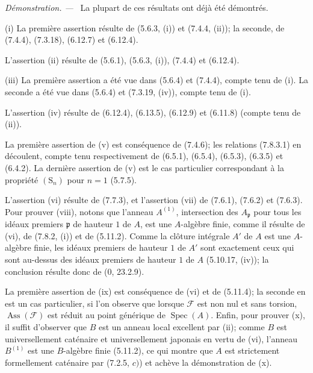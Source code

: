 \documentclass[10pt,oneside]{book}
\newenvironment{proof}{%
  \par\medskip\noindent\textit{Démonstration. ---\ }}{\par}
\begin{document}
\begin{proof}
La plupart de ces résultats ont déjà été démontrés.

(i) La première assertion résulte de (5.6.3, (i)) et (7.4.4, (ii)); la seconde,
de (7.4.4), (7.3.18), (6.12.7) et (6.12.4).

L'assertion (ii) résulte de (5.6.1), (5.6.3, (i)), (7.4.4) et (6.12.4).

(iii) La première assertion a été vue dans (5.6.4) et (7.4.4), compte tenu de
(i). La seconde a été vue dans (5.6.4) et (7.3.19, (iv)), compte tenu de (i).

L'assertion (iv) résulte de (6.12.4), (6.13.5), (6.12.9) et (6.11.8) (compte
tenu de (ii)).

La première assertion de (v) est conséquence de (7.4.6); les relations
(7.8.3.1) en découlent, compte tenu respectivement de (6.5.1), (6.5.4),
(6.5.3), (6.3.5) et (6.4.2). La dernière assertion de (v) est le cas
particulier correspondant à la propriété $(\mathrm S_n)$ pour $n=1$ (5.7.5).

L'assertion (vi) résulte de (7.7.3), et l'assertion (vii) de (7.6.1), (7.6.2)
et (7.6.3). Pour prouver (viii), notons que l'anneau $A^{(1)}$, intersection
des $A_{\mathfrak p}$ pour tous les idéaux premiers $\mathfrak p$ de hauteur
$1$ de $A$, est une $A$-algèbre finie, comme il résulte de (vi), de (7.8.2,
(i)) et de (5.11.2). Comme la clôture intégrale $A'$ de $A$ est une $A$-algèbre
finie, les idéaux premiers de hauteur $1$ de $A'$ sont exactement ceux qui sont
au-dessus des idéaux premiers de hauteur $1$ de $A$ (5.10.17, (iv)); la
conclusion résulte donc de (0, 23.2.9).

La première assertion de (ix) est conséquence de (vi) et de (5.11.4); la
seconde en est un cas particulier, si l'on observe que lorsque $\mathcal F$ est
non nul et sans torsion, $\operatorname{Ass}(\mathcal F)$ est réduit au point générique de
$\operatorname{Spec}(A)$. Enfin, pour prouver (x), il suffit d'observer que $B$
est un anneau local excellent par (ii); comme $B$ est universellement caténaire
et universellement japonais en vertu de (vi), l'anneau $B^{(1)}$ est une
$B$-algèbre finie (5.11.2), ce qui montre que $A$ est strictement formellement
caténaire par (7.2.5, $c)$) et achève la démonstration de (x).
\end{proof}
\end{document}
